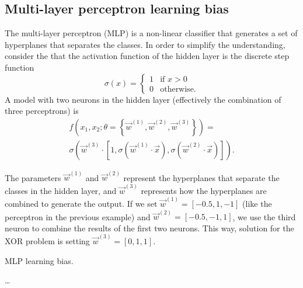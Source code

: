 \subsection{Multi-layer perceptron learning bias}

The multi-layer perceptron (MLP) is a non-linear classifier that generates a set of hyperplanes
that separates the classes.  In order to simplify the understanding, consider the
that the activation function of the hidden layer is the discrete step function
\begin{equation*}
  \sigma(x) = \begin{cases}
    1 & \text{if } x > 0 \\
    0 & \text{otherwise.}
  \end{cases}
\end{equation*}
A model with two neurons in the hidden layer (effectively the combination of three
perceptrons) is
\begin{multline*}
  f(x_1, x_2; \theta = \left\{ \vec{w}^{(1)}, \vec{w}^{(2)}, \vec{w}^{(3)} \right\}) = \\
  \sigma\left(
    \vec{w}^{(3)} \cdot \left[1, \sigma(\vec{w}^{(1)} \cdot \vec{x}), \sigma(\vec{w}^{(2)} \cdot \vec{x})\right]
  \right)\text{.}
\end{multline*}

The parameters $\vec{w}^{(1)}$ and $\vec{w}^{(2)}$ represent the hyperplanes that separate
the classes in the hidden layer, and $\vec{w}^{(3)}$ represents how the hyperplanes are
combined to generate the output.  If we set $\vec{w}^{(1)} = [-0.5, 1, -1]$ (like the
perceptron in the previous example) and $\vec{w}^{(2)} = [-0.5, -1, 1]$, we use the third neuron
to combine the results of the first two neurons.  This way, solution for the XOR problem is
setting $\vec{w}^{(3)} = [0, 1, 1]$.

\begin{figurebox}[label=fig:mlp]{MLP learning bias.}
  \centering
  \tcblower
  \dots
\end{figurebox}

